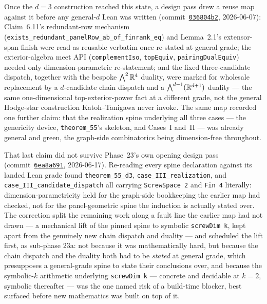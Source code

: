Once the $d = 3$ construction reached this state, a design pass drew a
reuse map against it before any general-$d$ Lean was written
(commit~\href{https://github.com/bryangingechen/CombinatorialRigidity/commit/036804b2a715e8eddc2e5f60d746a7e958028550}{\texttt{036804b2}},
2026-06-07): Claim~6.11's redundant-row mechanism
(\texttt{exists\_redundant\_panelRow\_ab\_of\_finrank\_eq}) and
Lemma~2.1's extensor-span finish were read as reusable verbatim once
re-stated at general grade; the exterior-algebra meet API
(\texttt{complementIso}, \texttt{topEquiv}, \texttt{pairingDualEquiv})
needed only dimension-parametric re-statement; and the fixed
three-candidate dispatch, together with the bespoke $\bigwedge^2{\mathbb{R}}^4$
duality, were marked for wholesale replacement by a $d$-candidate chain
dispatch and a $\bigwedge^{d-1}({\mathbb{R}}^{d+1})$ duality --- the same
one-dimensional top-exterior-power fact at a different grade, not the
general Hodge-star construction Katoh--Tanigawa never invoke. The same
map recorded one further claim: that the realization spine underlying
all three cases --- the genericity device, \texttt{theorem\_55}'s
skeleton, and Cases~I and~II --- was already general and green, the
graph-side combinatorics being dimension-free throughout.

That last claim did not survive Phase~23's own opening design pass
(commit~\href{https://github.com/bryangingechen/CombinatorialRigidity/commit/6ea8a69147abc813afd33ab1d9d00ba6c2660cb7}{\texttt{6ea8a691}},
2026-06-17). Re-reading every spine declaration against its landed Lean
grade found \texttt{theorem\_55\_d3}, \texttt{case\_III\_realization},
and \texttt{case\_III\_candidate\_dispatch} all carrying
\texttt{ScrewSpace 2} and \texttt{Fin 4} literally: dimension-parametricity
held for the graph-side bookkeeping the earlier map had checked, not for
the panel-geometric spine the induction is actually stated over. The
correction split the remaining work along a fault line the earlier map
had not drawn --- a mechanical lift of the pinned spine to symbolic
\texttt{screwDim k}, kept apart from the genuinely new chain dispatch and
duality --- and scheduled the lift first, as sub-phase 23a: not because
it was mathematically hard, but because the chain dispatch and the
duality both had to be \emph{stated} at general grade, which presupposes
a general-grade spine to state their conclusions over, and because the
symbolic-$k$ arithmetic underlying \texttt{screwDim k} --- concrete and
decidable at $k = 2$, symbolic thereafter --- was the one named risk of a
build-time blocker, best surfaced before new mathematics was built on
top of it.

